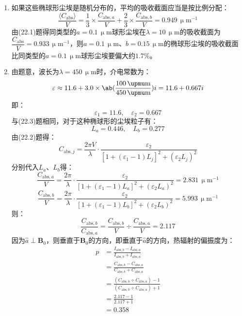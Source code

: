 \documentclass[a4paper,fontset=none]{ctexart}
\newcommand{\um}{\upmu\mathrm{m}}
\renewcommand\epsilon{\varepsilon}
\begin{document}
\begin{enumerate}
    \medskip
    \item[22.3 (c)]
    如果这些椭球形尘埃是随机分布的，平均的吸收截面应当是按比例分配：
    \[
        \frac{\langle C_{\mathrm{abs}} \rangle}{V} = \frac{1}{3} \times \frac{C_{\mathrm{abs},a}}{V} + \frac{2}{3} \times\frac{C_{\mathrm{abs},b}}{V} = 0.949\,\um^{-1}
    \]
    由(22.1)题得同类型的$a = 0.1\,\um$球形尘埃在$\lambda = 10\,\um$的吸收截面为$\dfrac{C_{\mathrm{abs}}}{V} = 0.933\,\um^{-1}$，则$a = 0.1\,\um$、$b = 0.15\,\um$的椭球形尘埃的吸收截面比同类型的$a = 0.1\,\um$球形尘埃要偏大约$1.7\%$。

    \bigskip
    \item[22.4 ]
    由题意，波长为$\lambda = 450\,\um$时，介电常数为：
    \[
        \epsilon \approx 11.6 + 3.0 \times \ab(\frac{100\,\um}{450\,\um})i = 11.6 + 0.667i
    \]
    即：
    \[
        \epsilon_1 = 11.6,\quad \epsilon_2 = 0.667
    \]
    与(22.3)题相同，对于这种椭球形的尘埃粒子有：
    \[
        L_a = 0.446,\quad L_b = 0.277
    \]
    由(22.2)题得：
    \[
        C_{\mathrm{abs},j} = \frac{2\pi V}{\lambda} \cdot \frac{\epsilon_2}{[1 + (\epsilon_1 - 1)L_j]^2 + (\epsilon_2 L_j)^2}
    \]
    分别代入$L_a$、$L_b$得：
    \[
        \frac{C_{\mathrm{abs},a}}{V} = \frac{2\pi}{\lambda} \cdot \frac{\epsilon_2}{[1 + (\epsilon_1 - 1)L_a]^2 + (\epsilon_2 L_a)^2} = 2.831\,\um^{-1}
    \]
    \[
        \frac{C_{\mathrm{abs},b}}{V} = \frac{2\pi}{\lambda} \cdot \frac{\epsilon_2}{[1 + (\epsilon_1 - 1)L_b]^2 + (\epsilon_2 L_b)^2} = 5.993\,\um^{-1}
    \]
    则：
    \[
        \frac{C_{\mathrm{abs},b}}{C_{\mathrm{abs},a}} = \frac{C_{\mathrm{abs},b}}{V} \div \frac{C_{\mathrm{abs},a}}{V} = 2.117
    \]
    因为$\hat{a} \perp \mathbf{B}_0$，则垂直于$\mathbf{B}_0$的方向，即垂直于$\hat{a}$的方向，热辐射的偏振度为：
    \begin{align*}
        p
        &= \frac{I_{\mathrm{abs},b} - I_{\mathrm{abs},a}}{I_{\mathrm{abs},b} + I_{\mathrm{abs},a}} \\
        &= \frac{C_{\mathrm{abs},b} - C_{\mathrm{abs},a}}{C_{\mathrm{abs},b} + C_{\mathrm{abs},a}} \\
        &= \frac{(C_{\mathrm{abs},b} \div C_{\mathrm{abs},a}) - 1}{(C_{\mathrm{abs},b} \div C_{\mathrm{abs},a}) + 1} \\
        &= \frac{2.117 - 1}{2.117 + 1} \\
        &= 0.358
    \end{align*}

\end{enumerate}
\end{document}
